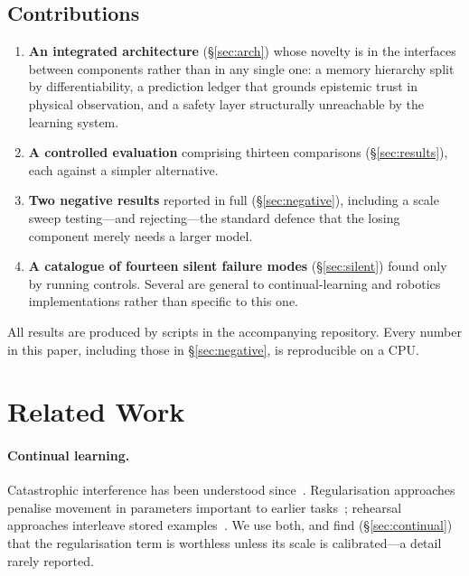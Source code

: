 \documentclass[10pt,twocolumn]{article}
\begin{document}
\subsection{Contributions}

\begin{enumerate}\itemsep2pt
  \item \textbf{An integrated architecture} (\S\ref{sec:arch}) whose novelty is
        in the interfaces between components rather than in any single one: a
        memory hierarchy split by differentiability, a prediction ledger that
        grounds epistemic trust in physical observation, and a safety layer
        structurally unreachable by the learning system.
  \item \textbf{A controlled evaluation} comprising thirteen comparisons
        (\S\ref{sec:results}), each against a simpler alternative.
  \item \textbf{Two negative results} reported in full
        (\S\ref{sec:negative}), including a scale sweep testing---and
        rejecting---the standard defence that the losing component merely needs
        a larger model.
  \item \textbf{A catalogue of fourteen silent failure modes}
        (\S\ref{sec:silent}) found only by running controls. Several are
        general to continual-learning and robotics implementations rather than
        specific to this one.
\end{enumerate}

All results are produced by scripts in the accompanying repository. Every
number in this paper, including those in \S\ref{sec:negative}, is reproducible
on a CPU.

\section{Related Work}

\paragraph{Continual learning.} Catastrophic interference has been understood
since~\cite{mccloskey1989}. Regularisation approaches penalise movement in
parameters important to earlier tasks~\cite{kirkpatrick2017,zenke2017};
rehearsal approaches interleave stored examples~\cite{rolnick2019}. We use both,
and find (\S\ref{sec:continual}) that the regularisation term is worthless
unless its scale is calibrated---a detail rarely reported.
\end{document}
